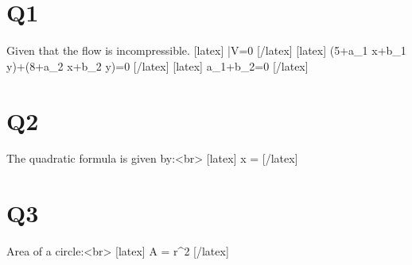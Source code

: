 \section*{Q1}
Given that the flow is incompressible.
[latex] \therefore \quad {} \bar{V}=0 [/latex]
[latex] \left(5+a_{1} x+b_{1} y\right)+\left(8+a_{2} x+b_{2} y\right)=0 [/latex]
[latex] a_{1}+b_{2}=0 [/latex]

\section*{Q2}
The quadratic formula is given by:<br>
[latex] x =  [/latex]

\section*{Q3}
Area of a circle:<br>
[latex] A = \pi r^2 [/latex]
